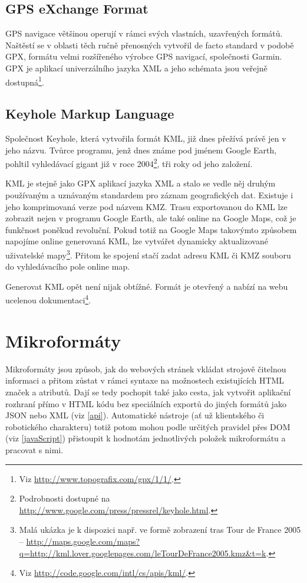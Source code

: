 \subsection{GPS eXchange Format}
GPS navigace většinou operují v rámci svých vlastních, uzavřených
formátů. Naštěstí se v oblasti těch ručně přenosných vytvořil de
facto standard v podobě GPX, formátu velmi rozšířeného výrobce GPS
navigací, společnosti Garmin. GPX je aplikací univerzálního jazyka
XML a jeho schémata jsou veřejně dostupná\footnote{Viz
\url{http://www.topografix.com/gpx/1/1/}.}.

\subsection{Keyhole Markup Language}
Společnost Keyhole, která vytvořila formát KML, již dnes přežívá
právě jen v jeho názvu. Tvůrce programu, jenž dnes známe pod jménem
Google Earth, pohltil vyhledávací gigant již v roce
2004\footnote{Podrobnosti dostupné na
\url{http://www.google.com/press/pressrel/keyhole.html}.}, tři roky od
jeho založení.

KML je stejně jako GPX aplikací jazyka XML a stalo se vedle něj
druhým používaným a uznávaným standardem pro záznam geografických
dat. Existuje i jeho komprimovaná verze pod názvem KMZ. Trasu
exportovanou do KML lze zobrazit nejen v programu Google Earth, ale
také online na Google Maps, což je funkčnost poněkud revoluční. Pokud
totiž na Google Maps takovýmto způsobem napojíme online generovaná
KML, lze vytvářet dy\-na\-mic\-ky aktualizované uživatelské
mapy\footnote{Malá ukázka je k dispozici např. ve formě zobrazení tras Tour de France
2005 --
\url{http://maps.google.com/maps?q=http://kml.lover.googlepages.com/leTourDeFrance2005.kmz&t=k}.}.
Přitom ke spojení stačí zadat adresu KML či KMZ souboru do vyhledávacího pole online map.

Generovat KML opět není nijak obtížné. Formát je otevřený a nabízí na
webu ucelenou dokumentaci\footnote{Viz
\url{http://code.google.com/intl/cs/apis/kml/}.}.

\section{Mikroformáty}\label{microformats}
Mikroformáty jsou způsob, jak do webových stránek vkládat strojově
čitelnou informaci a přitom zůstat v rámci syntaxe na možnostech
existujících HTML značek a atributů. Dají se tedy pochopit také jako
cesta, jak vytvořit aplikační rozhraní přímo v HTML kódu bez
speciálních exportů do jiných formátů jako JSON nebo XML (viz
\ref{api}). Automatické nástroje (ať už klientského či robotického
charakteru) totiž potom mohou podle určitých pravidel přes DOM (viz
\ref{javaScript}) přistoupit k hodnotám jednotlivých položek
mikroformátu a pracovat s nimi.


